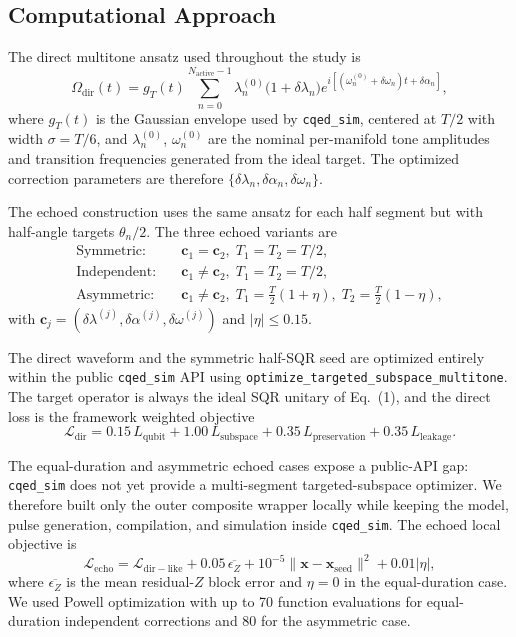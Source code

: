 \documentclass[aps,pra,twocolumn,reprint,floatfix,amsmath,amssymb]{revtex4-2}
\begin{document}
\subsection{Computational Approach}
The direct multitone ansatz used throughout the study is
\begin{equation}
\Omega_{\mathrm{dir}}(t)
=
g_T(t)\sum_{n=0}^{N_{\mathrm{active}}-1}
\lambda_n^{(0)}\bigl(1+\delta\lambda_n\bigr)
e^{i[(\omega_n^{(0)}+\delta\omega_n)t+\delta\alpha_n]},
\label{eq:direct_ansatz}
\end{equation}
where $g_T(t)$ is the Gaussian envelope used by \texttt{cqed\_sim}, centered at $T/2$ with width $\sigma=T/6$, and $\lambda_n^{(0)}$, $\omega_n^{(0)}$ are the nominal per-manifold tone amplitudes and transition frequencies generated from the ideal target. The optimized correction parameters are therefore $\{\delta\lambda_n,\delta\alpha_n,\delta\omega_n\}$.

The echoed construction uses the same ansatz for each half segment but with half-angle targets $\theta_n/2$. The three echoed variants are
\begin{align}
\text{Symmetric:} \quad & \mathbf{c}_1=\mathbf{c}_2,\; T_1=T_2=T/2, \\
\text{Independent:} \quad & \mathbf{c}_1\neq \mathbf{c}_2,\; T_1=T_2=T/2, \\
\text{Asymmetric:} \quad & \mathbf{c}_1\neq \mathbf{c}_2,\; T_1=\tfrac{T}{2}(1+\eta),\; T_2=\tfrac{T}{2}(1-\eta),
\end{align}
with $\mathbf{c}_j=(\delta\lambda^{(j)},\delta\alpha^{(j)},\delta\omega^{(j)})$ and $|\eta|\le 0.15$.

The direct waveform and the symmetric half-SQR seed are optimized entirely within the public \texttt{cqed\_sim} API using \texttt{optimize\_targeted\_subspace\_multitone}. The target operator is always the ideal SQR unitary of Eq.~(1), and the direct loss is the framework weighted objective
\begin{equation}
\mathcal{L}_{\mathrm{dir}}
=
0.15\,L_{\mathrm{qubit}}
+1.00\,L_{\mathrm{subspace}}
+0.35\,L_{\mathrm{preservation}}
+0.35\,L_{\mathrm{leakage}}.
\end{equation}

The equal-duration and asymmetric echoed cases expose a public-API gap: \texttt{cqed\_sim} does not yet provide a multi-segment targeted-subspace optimizer. We therefore built only the outer composite wrapper locally while keeping the model, pulse generation, compilation, and simulation inside \texttt{cqed\_sim}. The echoed local objective is
\begin{equation}
\mathcal{L}_{\mathrm{echo}}
=
\mathcal{L}_{\mathrm{dir-like}}
+0.05\,\overline{\epsilon_Z}
+10^{-5}\|\mathbf{x}-\mathbf{x}_{\mathrm{seed}}\|^2
+0.01|\eta|,
\label{eq:echo_objective}
\end{equation}
where $\overline{\epsilon_Z}$ is the mean residual-$Z$ block error and $\eta=0$ in the equal-duration case. We used Powell optimization with up to 70 function evaluations for equal-duration independent corrections and 80 for the asymmetric case.
\end{document}
